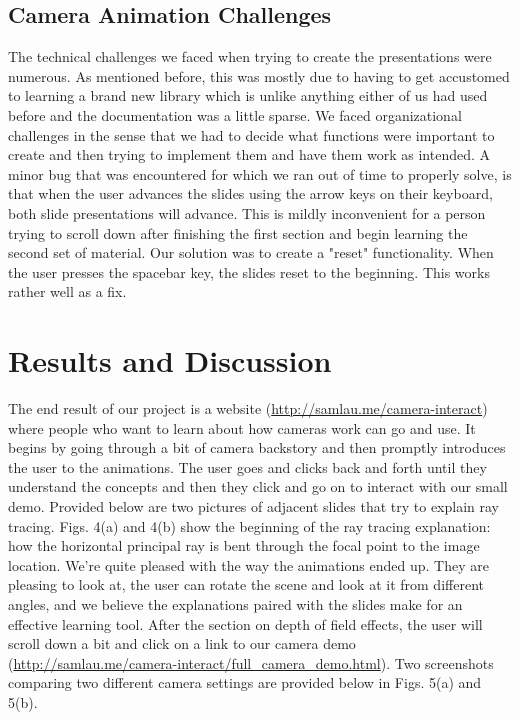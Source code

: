 \documentclass{acm_proc_article-sp}
\begin{document}
\subsection{Camera Animation Challenges}
The technical challenges we faced when trying to create the presentations were
numerous. As mentioned before, this was mostly due to having to get accustomed
to learning a brand new library which is unlike anything either of us had used
before and the documentation was a little sparse. We faced organizational
challenges in the sense that we had to decide what functions were important to
create and then trying to implement them and have them work as intended. A
minor bug that was encountered for which we ran out of time to properly solve,
is that when the user advances the slides using the arrow keys on their
keyboard, both slide presentations will advance. This is mildly inconvenient
for a person trying to scroll down after finishing the first section and begin
learning the second set of material. Our solution was to create a "reset"
functionality. When the user presses the spacebar key, the slides reset to the
beginning. This works rather well as a fix.

\section{Results and Discussion}
The end result of our project is a website
(\url{http://samlau.me/camera-interact}) where people who want to learn
about how cameras work can go and use. It begins by going through a bit of
camera backstory and then promptly introduces the user to the animations. The
user goes and clicks back and forth until they understand the concepts and then
they click and go on to interact with our small demo. Provided below are two
pictures of adjacent slides that try to explain ray tracing. Figs. 4(a) and
4(b) show the beginning of the ray tracing explanation: how the horizontal
principal ray is bent through the focal point to the image location. We're
quite pleased with the way the animations ended up. They are pleasing to look
at, the user can rotate the scene and look at it from different angles, and we
believe the explanations paired with the slides make for an effective learning
tool. After the section on depth of field effects, the user will scroll down a
bit and click on a link to our camera demo
(\url{http://samlau.me/camera-interact/full_camera_demo.html}). Two
screenshots comparing two different camera settings are provided below in Figs.
5(a) and 5(b).
\end{document}
